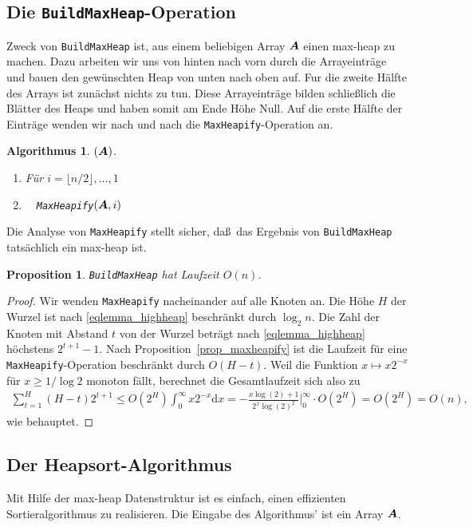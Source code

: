 \documentclass[10pt,reqno]{amsart}
\numberwithin{equation}{section}
\newcommand\vA{\vec A}
\newcommand\dd{{\mathrm d}}
\def\vec#1{\mathchoice{\mbox{\boldmath$\displaystyle#1$}}
{\mbox{\boldmath$\textstyle#1$}}
{\mbox{\boldmath$\scriptstyle#1$}}
{\mbox{\boldmath$\scriptscriptstyle#1$}}}
\newtheorem{proposition}[definition]{Proposition}
\newtheorem{algorithm}[definition]{Algorithmus}
\newcommand\Prop{Proposition}
\begin{document}
\subsection{Die {\tt BuildMaxHeap}-Operation}\label{sec_buildmaxheap}
Zweck von {\tt BuildMaxHeap} ist, aus einem beliebigen Array $\vA$ einen max-heap zu machen.
Dazu arbeiten wir uns von hinten nach vorn durch die Arrayeintr\"age und bauen den gew\"unschten Heap von unten nach oben auf.
Fur die zweite H\"alfte des Arrays ist zun\"achst nichts zu tun.
Diese Arrayeintr\"age bilden schlie\ss lich die Bl\"atter des Heaps und haben somit am Ende H\"ohe Null.
Auf die erste H\"alfte der Eintr\"age wenden wir nach und nach die {\tt MaxHeapify}-Operation an.

\begin{algorithm}$(\vA)$.\label{alg_buildmaxheap}
	\begin{enumerate}
		\item F\"ur $i=\lfloor n/2\rfloor,\ldots,1$
		\item $\quad${\tt MaxHeapify}$(\vA,i)$
	\end{enumerate}
\end{algorithm}

Die Analyse von {\tt MaxHeapify} stellt sicher, da\ss\ das Ergebnis von {\tt BuildMaxHeap} tats\"achlich ein max-heap ist.

\begin{proposition}\label{prop_buildmaxheap}
	{\tt BuildMaxHeap} hat Laufzeit $O(n)$.
\end{proposition}
\begin{proof}
	Wir wenden {\tt MaxHeapify} nacheinander auf alle Knoten an.
	Die H\"ohe $H$ der Wurzel ist nach \eqref{eqlemma_highheap} beschr\"ankt durch $\log_2n$.
	Die Zahl der Knoten mit Abstand $t$ von der Wurzel betr\"agt nach \eqref{eqlemma_highheap} h\"ochstens $2^{t+1}-1$.
	Nach \Prop~\ref{prop_maxheapify} ist die Laufzeit f\"ur eine {\tt MaxHeapify}-Operation beschr\"ankt durch $O(H-t)$.
	Weil die Funktion $x\mapsto x2^{-x}$ f\"ur $x\geq1/\log2$ monoton f\"allt, berechnet die Gesamtlaufzeit sich also zu
	\begin{align*}
		\sum_{t=1}^{H}(H-t)2^{t+1}\leq O(2^{H})\int_0^{\infty}x2^{-x}\dd x=
		-\frac{x\log(2)+1}{2^x\log(2)^2}\bigg|_0^\infty\cdot O(2^H)=O(2^H)=O(n),
	\end{align*}
	wie behauptet.
\end{proof}

\subsection{Der Heapsort-Algorithmus}\label{sec_hs}
Mit Hilfe der max-heap Datenstruktur ist es einfach, einen effizienten Sortieralgorithmus zu realisieren.
Die Eingabe des Algorithmus' ist ein Array $\vA$.
\end{document}
